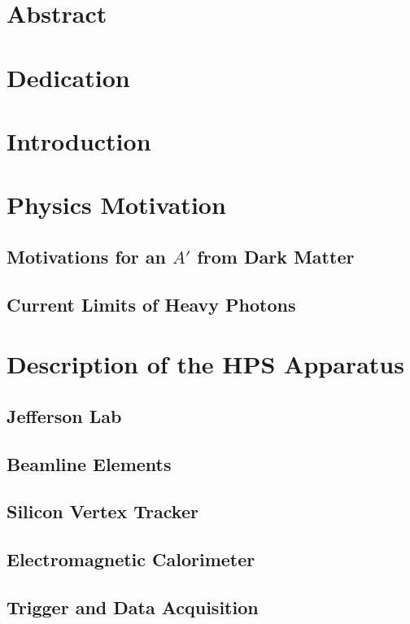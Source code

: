 \documentclass[12pt]{report}
\begin{document}
\chapter*{Abstract}

\chapter*{Dedication}

\tableofcontents

\chapter{Introduction}

\chapter{Physics Motivation}

\section{Motivations for an $A'$ from Dark Matter}
\section{Current Limits of Heavy Photons}

\chapter{Description of the HPS Apparatus}

\section{Jefferson Lab}
\section{Beamline Elements}
\section{Silicon Vertex Tracker}
\section{Electromagnetic Calorimeter}
\section{Trigger and Data Acquisition}
\end{document}
